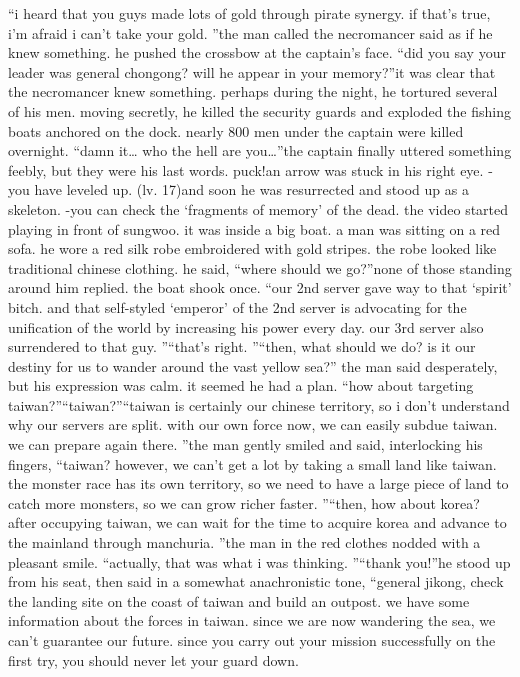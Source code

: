 “i heard that you guys made lots of gold through pirate synergy.
 if that’s true, i’m afraid i can’t take your gold.
”the man called the necromancer said as if he knew something.
 he pushed the crossbow at the captain’s face.
“did you say your leader was general chongong? will he appear in your memory?”it was clear that the necromancer knew something.
 perhaps during the night, he tortured several of his men.
 moving secretly, he killed the security guards and exploded the fishing boats anchored on the dock.
nearly 800 men under the captain were killed overnight.
“damn it… who the hell are you…”the captain finally uttered something feebly, but they were his last words.
puck!an arrow was stuck in his right eye.
-you have leveled up.
 (lv.
 17)and soon he was resurrected and stood up as a skeleton.
-you can check the ‘fragments of memory’ of the dead.
the video started playing in front of sungwoo.
it was inside a big boat.
 a man was sitting on a red sofa.
 he wore a red silk robe embroidered with gold stripes.
 the robe looked like traditional chinese clothing.
he said, “where should we go?”none of those standing around him replied.
 the boat shook once.
“our 2nd server gave way to that ‘spirit’ bitch.
 and that self-styled ‘emperor’ of the 2nd server is advocating for the unification of the world by increasing his power every day.
 our 3rd server also surrendered to that guy.
”“that’s right.
”“then, what should we do? is it our destiny for us to wander around the vast yellow sea?” the man said desperately, but his expression was calm.
it seemed he had a plan.
“how about targeting taiwan?”“taiwan?”“taiwan is certainly our chinese territory, so i don’t understand why our servers are split.
 with our own force now, we can easily subdue taiwan.
 we can prepare again there.
”the man gently smiled and said, interlocking his fingers, “taiwan? however, we can’t get a lot by taking a small land like taiwan.
 the monster race has its own territory, so we need to have a large piece of land to catch more monsters, so we can grow richer faster.
”“then, how about korea? after occupying taiwan, we can wait for the time to acquire korea and advance to the mainland through manchuria.
”the man in the red clothes nodded with a pleasant smile.
“actually, that was what i was thinking.
”“thank you!”he stood up from his seat, then said in a somewhat anachronistic tone, “general jikong, check the landing site on the coast of taiwan and build an outpost.
 we have some information about the forces in taiwan.
 since we are now wandering the sea, we can’t guarantee our future.
 since you carry out your mission successfully on the first try, you should never let your guard down.
